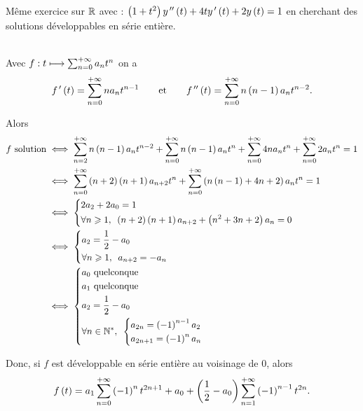 \begin{corr}
\end{corr}

\begin{exo}
Même exercice sur \(\mathbb{R}\) avec : \(\left(1+t^2\right)y^{\,\prime\prime}\left(t\right)+4ty^{\,\prime}\left(t\right)+2y\left(t\right)=1\) en cherchant des solutions développables en série entière.
\end{exo}

\begin{corr}~\\
Avec \(f:t\longmapsto\sum_{n=0}^{+\infty}a_nt^n\) on a \[f^{\,\prime}\left(t\right)=\sum_{n=0}^{+\infty}na_nt^{n-1}\qquad\text{et}\qquad f^{\,\prime\prime}\left(t\right)=\sum_{n=0}^{+\infty}n\left(n-1\right)a_nt^{n-2}.\]

Alors \[\begin{aligned}
f\text{ solution}&\ssi\sum_{n=2}^{\pinf}n\paren{n-1}a_nt^{n-2}+\sum_{n=0}^{\pinf}n\paren{n-1}a_nt^n+\sum_{n=0}^{\pinf}4na_nt^n+\sum_{n=0}^{\pinf}2a_nt^n=1 \\
&\ssi\sum_{n=0}^{\pinf}\paren{n+2}\paren{n+1}a_{n+2}t^n+\sum_{n=0}^{\pinf}\paren{n\paren{n-1}+4n+2}a_nt^n=1 \\
&\ssi\begin{dcases}
2a_2+2a_0=1 \\
\quantifs{\forall n\geq1}\paren{n+2}\paren{n+1}a_{n+2}+\paren{n^2+3n+2}a_n=0
\end{dcases} \\
&\ssi\begin{dcases}
a_2=\dfrac{1}{2}-a_0 \\
\quantifs{\forall n\geq1}a_{n+2}=-a_n
\end{dcases} \\
&\ssi\begin{dcases}
a_0\text{ quelconque} \\
a_1\text{ quelconque} \\
a_2=\dfrac{1}{2}-a_0 \\
\quantifs{\forall n\in\Ns}\begin{dcases}
a_{2n}=\paren{-1}^{n-1}a_2 \\
a_{2n+1}=\paren{-1}^na_n
\end{dcases}
\end{dcases}
\end{aligned}\]

Donc, si \(f\) est développable en série entière au voisinage de \(0\), alors \[f\left(t\right)=a_1\sum_{n=0}^{+\infty}\left(-1\right)^nt^{2n+1}+a_0+\left(\dfrac{1}{2}-a_0\right)\sum_{n=1}^{+\infty}\left(-1\right)^{n-1}t^{2n}.\]


\end{corr}
